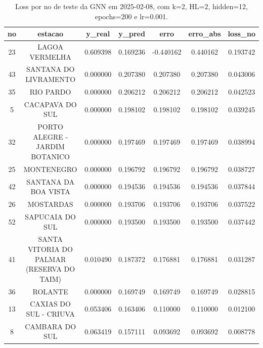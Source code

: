 \begin{table}[h]
\centering
\caption{Loss por no de teste da GNN em 2025-02-08, com k=2, HL=2, hidden=12, epochs=200 e lr=0.001.}
\label{tab:gnn_loss_k2_hl2_h12_e200_d20250208}
\begin{tabular}{ccccccc}
\toprule
no & estacao & y\_real & y\_pred & erro & erro\_abs & loss\_no \\
\midrule
23 & LAGOA VERMELHA & 0.609398 & 0.169236 & -0.440162 & 0.440162 & 0.193742 \\
43 & SANTANA DO LIVRAMENTO & 0.000000 & 0.207380 & 0.207380 & 0.207380 & 0.043006 \\
35 & RIO PARDO & 0.000000 & 0.206212 & 0.206212 & 0.206212 & 0.042523 \\
5 & CACAPAVA DO SUL & 0.000000 & 0.198102 & 0.198102 & 0.198102 & 0.039245 \\
32 & PORTO ALEGRE - JARDIM BOTANICO & 0.000000 & 0.197469 & 0.197469 & 0.197469 & 0.038994 \\
25 & MONTENEGRO & 0.000000 & 0.196792 & 0.196792 & 0.196792 & 0.038727 \\
42 & SANTANA DA BOA VISTA & 0.000000 & 0.194536 & 0.194536 & 0.194536 & 0.037844 \\
26 & MOSTARDAS & 0.000000 & 0.193706 & 0.193706 & 0.193706 & 0.037522 \\
52 & SAPUCAIA DO SUL & 0.000000 & 0.193500 & 0.193500 & 0.193500 & 0.037442 \\
41 & SANTA VITORIA DO PALMAR (RESERVA DO TAIM) & 0.010490 & 0.187372 & 0.176881 & 0.176881 & 0.031287 \\
36 & ROLANTE & 0.000000 & 0.169749 & 0.169749 & 0.169749 & 0.028815 \\
13 & CAXIAS DO SUL - CRIUVA & 0.053406 & 0.163406 & 0.110000 & 0.110000 & 0.012100 \\
8 & CAMBARA DO SUL & 0.063419 & 0.157111 & 0.093692 & 0.093692 & 0.008778 \\
\bottomrule
\end{tabular}
\end{table}
